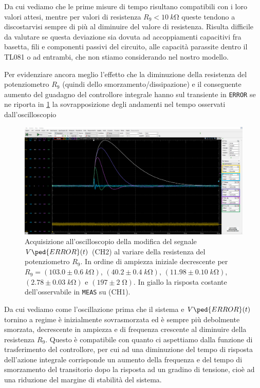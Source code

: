 \documentclass[10pt, a4paper, italian]{article}
\begin{document}
Da cui vediamo che le prime misure di tempo risultano compatibili con i loro
valori attesi, mentre per valori di resistenza $R_9 < \SI{10}{k\ohm}$ queste
tendono a discostarvisi sempre di più al diminuire del valore di resistenza.
Risulta difficile da valutare se questa deviazione sia dovuta ad accoppiamenti
capacitivi fra basetta, fili e componenti passivi del circuito, alle capacità
parassite dentro il TL081 o ad entrambi, che non stiamo considerando nel
nostro modello.

Per evidenziare ancora meglio l'effetto che la diminuzione della resistenza
del potenziometro $R_9$ (quindi dello smorzamento/dissipazione) e il
conseguente aumento del guadagno del controllore integrale hanno sul transiente
in \verb+ERROR+ se ne riporta in \cref{fig: intR9osc} la sovrapposizione degli
andamenti nel tempo osservati dall'oscilloscopio
\begin{figure}[htbp]
    \centering
	\includegraphics[width=\textwidth]{sqwrespfunction}
    \caption{Acquisizione all'oscilloscopio della modifica del segnale
    $V\ped{ERROR} (t)$ (CH2) al variare della resistenza del potenziometro
    $R_9$. In ordine di ampiezza iniziale decrescente per $R_9 =
    (103.0 \pm 0.6 \; \si{k\ohm})$, $(40.2 \pm 0.4 \; \si{k\ohm})$,
    $(11.98 \pm 0.10 \; \si{k\ohm})$, $(2.78 \pm 0.03 \; \si{k\ohm})$ e
    $(197 \pm 2 \; \si{\ohm})$.
    In giallo la risposta costante dell'osservabile in \texttt{MEAS} su (CH1).
    \label{fig: intR9osc}}
\end{figure}
Da cui vediamo come l'oscillazione prima che il sistema e $V\ped{ERROR} (t)$
tornino a regime è inizialmente sovrasmorzata ed è sempre più debolmente
smorzata, decrescente in ampiezza e di frequenza crescente al diminuire della
resistenza $R_9$. Questo è compatibile con quanto ci aspettiamo dalla funzione
di trasferimento del controllore, per cui ad una diminuzione del tempo di
risposta dell'azione integrale corrisponde un aumento della frequenza e del
tempo di smorzamento del transitorio dopo la risposta ad un gradino di
tensione, cioè ad una riduzione del margine di stabilità del sistema.
\end{document}
